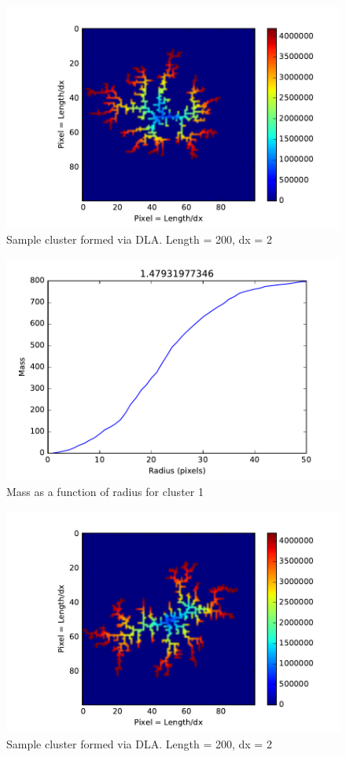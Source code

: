 \documentclass[a4paper]{article}
\begin{document}
\begin{figure}[H]
\centering
\includegraphics[width=.9\linewidth]{Cluster1.pdf}
\caption{Sample cluster formed via DLA. Length = 200, dx = 2}
\label{fig:Cluster1}
\end{figure}

\begin{figure}[H]
\centering
\includegraphics[width=.9\linewidth]{Cluster1dim.pdf}
\caption{Mass as a function of radius for cluster 1}
\label{fig:Fractal Dimension Plot for Cluster 1}
\end{figure}

\begin{figure}[H]
\centering
\includegraphics[width=.9\linewidth]{Cluster2.pdf}
\caption{Sample cluster formed via DLA. Length = 200, dx = 2}
\label{fig:Cluster2}
\end{figure}
\end{document}
